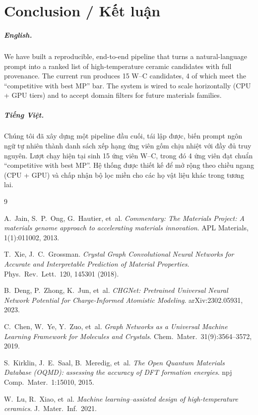 \documentclass[11pt,a4paper]{report}
\begin{document}
\chapter{Conclusion / Kết luận}

\paragraph{English.}
We have built a reproducible, end-to-end pipeline that turns a natural-language prompt into
a ranked list of high-temperature ceramic candidates with full provenance. The current run
produces 15 W--C candidates, 4 of which meet the ``competitive with best MP'' bar. The
system is wired to scale horizontally (CPU + GPU tiers) and to accept domain filters for
future materials families.

\paragraph{Tiếng Việt.}
Chúng tôi đã xây dựng một pipeline đầu cuối, tái lập được, biến prompt ngôn ngữ tự nhiên
thành danh sách xếp hạng ứng viên gốm chịu nhiệt với đầy đủ truy nguyên. Lượt chạy hiện tại
sinh 15 ứng viên W--C, trong đó 4 ứng viên đạt chuẩn ``competitive with best MP''. Hệ thống
được thiết kế để mở rộng theo chiều ngang (CPU + GPU) và chấp nhận bộ lọc miền cho các họ
vật liệu khác trong tương lai.

\begin{thebibliography}{9}

A.~Jain, S.~P.~Ong, G.~Hautier, et~al.
\textit{Commentary: The Materials Project: A materials genome approach to accelerating
materials innovation}. APL Materials, 1(1):011002, 2013.

T.~Xie, J.~C.~Grossman.
\textit{Crystal Graph Convolutional Neural Networks for Accurate and Interpretable
Prediction of Material Properties}. Phys.\ Rev.\ Lett.\ 120, 145301 (2018).

B.~Deng, P.~Zhong, K.~Jun, et~al.
\textit{CHGNet: Pretrained Universal Neural Network Potential for Charge-Informed
Atomistic Modeling}. arXiv:2302.05931, 2023.

C.~Chen, W.~Ye, Y.~Zuo, et~al.
\textit{Graph Networks as a Universal Machine Learning Framework for Molecules and
Crystals}. Chem.\ Mater.\ 31(9):3564--3572, 2019.

S.~Kirklin, J.~E.~Saal, B.~Meredig, et~al.
\textit{The Open Quantum Materials Database (OQMD): assessing the accuracy of DFT
formation energies}. npj Comp.\ Mater.\ 1:15010, 2015.

W.~Lu, R.~Xiao, et~al.
\textit{Machine learning--assisted design of high-temperature ceramics}. J.\ Mater.\
Inf.\ 2021.

\end{thebibliography}
\end{document}
